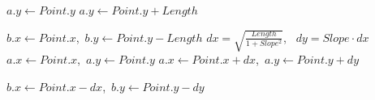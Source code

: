 \begin{algorithm}[tb!]
\begin{algorithmic}[1]
                    \State $ a.y \gets Point.y $
                \Else
                    \State $ a.y \gets Point.y + Length $
                \EndIf

                \State $ b.x \gets Point.x $,~$ b.y \gets Point.y - Length $
            \EndCase
            \Default
                \State $ dx = \sqrt{\frac{Length}{{1+Slope^2}}}$,~ $ dy = Slope \cdot dx $
                    \State $ a.x \gets Point.x $,~$ a.y \gets Point.y $
                \Else
                    \State $ a.x \gets Point.x + dx $,~$ a.y \gets Point.y + dy $
                \EndIf

                \State $ b.x \gets Point.x - dx $,~$ b.y \gets Point.y - dy $
            \EndDefault

        \EndSwitch

        \State {}

        \EndProcedure

    \end{algorithmic}
\end{algorithm}

